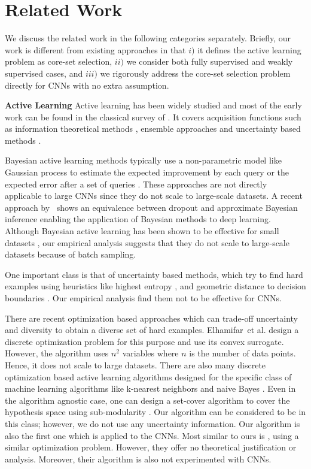 \documentclass{article} %
\begin{document}
\section{Related Work} We discuss the related work in the following categories
separately. Briefly, our work is different from existing approaches in that $i)$
it defines the active learning problem as core-set selection, $ii)$ we consider
both fully supervised and weakly supervised cases, and $ iii)$ we rigorously
address the core-set selection problem directly for CNNs with no extra
assumption. 


\noindent\textbf{Active Learning} Active learning has been widely studied and
most of the early work can be found in the classical survey
of \citet{settles2010active}. It covers acquisition functions such as
information theoretical methods \citep{mackay1992information}, ensemble
approaches \citep{mccallumzy1998employing, freund1997selective} and uncertainty
based methods
\citep{tong2001support,joshi2009multi,li2013adaptive}.

Bayesian active learning methods typically use a non-parametric model like
Gaussian process to estimate the expected improvement by each query
\citep{kapoor2007active} or the expected error after a set of queries
\citep{roy2001toward}. These approaches are not directly applicable to large CNNs since they do not scale to large-scale datasets. A recent approach by~\citet{gal_bayes} shows an equivalence between dropout and approximate
Bayesian inference enabling the application of Bayesian methods to deep
learning. Although Bayesian active learning has been shown to be effective
for small datasets \citep{gal_active}, our empirical analysis suggests that they do not scale to large-scale datasets because of batch sampling.

One important class is that of uncertainty based methods, which try to find hard
examples using heuristics like highest entropy \citep{joshi2009multi}, and
geometric distance to decision boundaries
\citep{tong2001support,brinker2003incorporating}. Our empirical analysis find them not to be effective for CNNs.


There are recent optimization based approaches which can trade-off uncertainty
and diversity to obtain a diverse set of hard examples. Elhamifar~et al.
\citep{elhamifar2013convex} design a discrete optimization problem for this
purpose and use its convex surrogate. However, the algorithm uses $n^2$
variables where $n$ is the number of data points. Hence, it does not scale to
large datasets. There are also many discrete optimization based active
learning algorithms designed for the specific class of machine learning
algorithms like k-nearest neighbors and naive Bayes \citep{wei2015submodularity}.
Even in the algorithm agnostic case, one can design a set-cover algorithm to
cover the hypothesis space using sub-modularity \citep{guillory2010interactive,
golovin2011adaptive}. Our algorithm can be considered to be in this class;
however, we do not use any uncertainty information. Our algorithm is also the
first one which is applied to the CNNs. Most similar to ours is \citep{porikli},
using a similar optimization problem. However, they offer no theoretical
justification or analysis. Moreover, their algorithm is also not experimented with CNNs.
\end{document}
